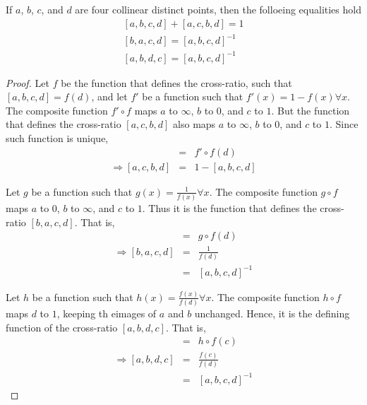 \begin{prop}
  If $a$, $b$, $c$, and $d$ are four collinear distinct points, then the folloeing equalities
  hold
  \begin{eqnarray*}
    \left[a,b,c,d\right]+\left[a,c,b,d\right]=1 \\
    \left[b,a,c,d\right]=\left[a,b,c,d\right]^{-1} \\
    \left[a,b,d,c\right]=\left[a,b,c,d\right]^{-1}
  \end{eqnarray*}
\end{prop}

\begin{proof}
  Let $f$ be the function that defines the cross-ratio, such that $[a,b,c,d]=f(d)$, and let
  $f'$ be a function such that $f'(x)=1-f(x)\forall x$. The composite function $f'\circ f$ maps
  $a$ to $\infty$, $b$ to $0$, and $c$ to $1$. But the function that defines the cross-ratio
  $[a,c,b,d]$ also maps $a$ to $\infty$, $b$ to $0$, and $c$ to $1$. Since such function is
  unique,
  \begin{eqnarray*}
    [a,c,b,d] &=& f'\circ f(d) \\
    \Longrightarrow [a,c,b,d] &=& 1-[a,b,c,d]
  \end{eqnarray*}

  Let $g$ be a function such that $g(x)=\frac{1}{f(x)}\forall x$. The composite function
  $g\circ f$ maps $a$ to $0$, $b$ to $\infty$, and $c$ to $1$. Thus it is the function that
  defines the cross-ratio $[b,a,c,d]$. That is,
  \begin{eqnarray*}
    [b,a,c,d] &=& g\circ f(d) \\
    \Longrightarrow [b,a,c,d] &=& \frac{1}{f(d)} \\
                              &=& [a,b,c,d]^{-1}
  \end{eqnarray*}

  Let $h$ be a function such that $h(x)=\frac{f(x)}{f(d)}\forall x$. The composite function
  $h\circ f$ maps $d$ to $1$, keeping th eimages of $a$ and $b$ unchanged. Hence, it is the
  defining function of the cross-ratio $[a,b,d,c]$. That is,
  \begin{eqnarray*}
    [a,b,d,c] &=& h\circ f(c) \\
    \Longrightarrow [a,b,d,c] &=& \frac{f(c)}{f(d)} \\
                              &=& [a,b,c,d]^{-1}
  \end{eqnarray*}
\end{proof}

